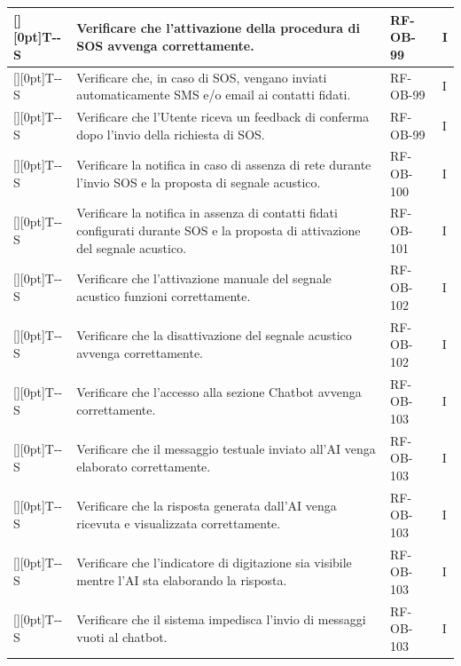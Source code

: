 \documentclass[a4paper,12pt]{article}
\newcounter{testsys}
\newcommand{\systestcode}{%
  \raisebox{0pt}[\height][0pt]{\hypertarget{T-\arabic{testsys}-S}{}}T-\arabic{testsys}-S%
}
\begin{document}
\begin{longtable}{| >{\centering\arraybackslash}p{} | >{\raggedright\arraybackslash}p{} | >{\centering\arraybackslash}p{} | >{\centering\arraybackslash}p{} |}
\stepcounter{testsys} \systestcode & Verificare che l'attivazione della procedura di SOS avvenga correttamente. & RF-OB-99 & I \\
\hline

\stepcounter{testsys} \systestcode & Verificare che, in caso di SOS, vengano inviati automaticamente SMS e/o email ai contatti fidati. & RF-OB-99 & I \\
\hline

\stepcounter{testsys} \systestcode & Verificare che l'Utente riceva un feedback di conferma dopo l'invio della richiesta di SOS. & RF-OB-99 & I \\
\hline

\stepcounter{testsys} \systestcode & Verificare la notifica in caso di assenza di rete durante l'invio SOS e la proposta di segnale acustico. & RF-OB-100 & I \\
\hline

\stepcounter{testsys} \systestcode & Verificare la notifica in assenza di contatti fidati configurati durante SOS e la proposta di attivazione del segnale acustico. & RF-OB-101 & I \\
\hline

\stepcounter{testsys} \systestcode & Verificare che l'attivazione manuale del segnale acustico funzioni correttamente. & RF-OB-102 & I \\
\hline

\stepcounter{testsys} \systestcode & Verificare che la disattivazione del segnale acustico avvenga correttamente. & RF-OB-102 & I \\
\hline

\stepcounter{testsys} \systestcode & Verificare che l'accesso alla sezione Chatbot avvenga correttamente. & RF-OB-103 & I \\
\hline

\stepcounter{testsys} \systestcode & Verificare che il messaggio testuale inviato all'AI venga elaborato correttamente. & RF-OB-103 & I \\
\hline

\stepcounter{testsys} \systestcode & Verificare che la risposta generata dall'AI venga ricevuta e visualizzata correttamente. & RF-OB-103 & I \\
\hline

\stepcounter{testsys} \systestcode & Verificare che l'indicatore di digitazione sia visibile mentre l'AI sta elaborando la risposta. & RF-OB-103 & I \\
\hline

\stepcounter{testsys} \systestcode & Verificare che il sistema impedisca l'invio di messaggi vuoti al chatbot. & RF-OB-103 & I \\
\hline


\end{longtable}
\end{document}
